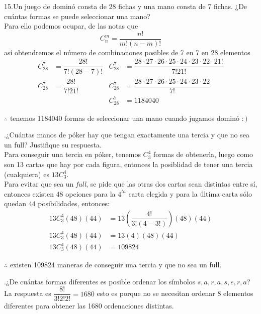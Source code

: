\documentclass[letterpaper]{article}
\renewcommand{\*}{\cdot}
\theoremstyle{definition}
\begin{document}
\noindent15.Un juego de dominó consta de 28 fichas y una mano consta de 7 fichas.
¿De cuántas formas se puede seleccionar una mano?\\
Para ello podemos ocupar, de las notas que 
\[ C_n^m = \dfrac{n!}{m!(n - m)!} \]así obtendremos el número de combinaciones posibles de 7 en 7 en 28 elementos
\begin{align*}
	C_{28}^7 &= \dfrac{28!}{7!(28 - 7)!} & C_{28}^7 &= \dfrac{28\* 27 \* 26 \* 25 \* 24 \* 23 \* 22 \* 21!}{7!21!}\\
	C_{28}^7 &= \dfrac{28!}{7!21!} & 	C_{28}^7 &= \dfrac{28\* 27 \* 26 \* 25 \* 24 \* 23 \* 22 }{7!}\\
	&  & C_{28}^7 &= 1184040
\end{align*}
\begin{center}
	$ \therefore $ tenemos 1184040 formas de seleccionar una mano cuando jugamos dominó $ :) $
\end{center}
.¿Cuántas manos de póker hay que tengan exactamente una tercia y que no sea un full? Justifique su respuesta.\\
Para conseguir una tercia en póker, tenemos $ C_3^4 $ formas de obtenerla, luego como son 13 cartas que hay por cada figura, entonces la posiblidad de tener una tercia (cualquiera) es $ 13 C_3^4  $.\\
Para evitar que sea un \textit{full}, se pide que las otras dos cartas sean distintas entre sí, entonces existen $ 48 $ opciones para la $ 4^{ta} $ carta elegida y para la última carta sólo quedan $ 44 $ posibilidades, entonces:
\begin{align*}
	13 C_3^4 (48)(44) &= 13 \left( \dfrac{4!}{3!(4-3!)} \right)(48)(44)\\
	13 C_3^4 (48)(44) &= 13(4)(48)(44)\\
	13 C_3^4 (48)(44) &= 109824
\end{align*}
\begin{center}
	$ \therefore $ existen 109824 maneras de conseguir una tercia y que no sea un full.
\end{center}
.¿De cuántas formas diferentes es posible ordenar los símbolos $ s,a,r,a,s,e,r,a $?\\
La respuesta es $ \dfrac{8!}{3!2!2!} =1680 $ esto es porque no se necesitan ordenar 8 elementos diferentes para obtener las 1680 ordenaciones distintas.\\
\end{document}
